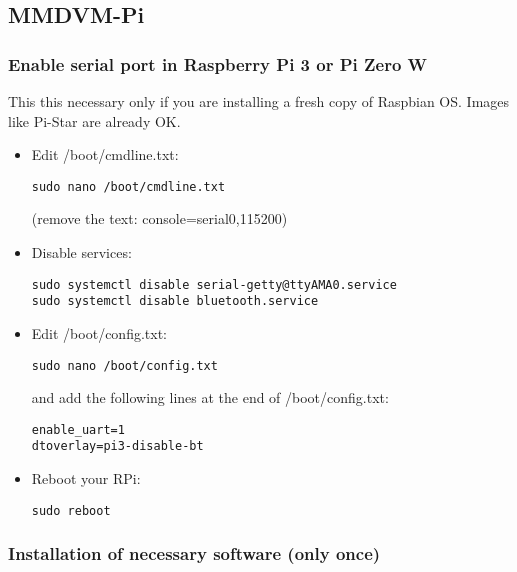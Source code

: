 \documentclass[]{article}
\begin{document}
\subsection{MMDVM-Pi}

\subsubsection{Enable serial port in Raspberry Pi 3 or Pi Zero W}

This this necessary only if you are installing a fresh copy of Raspbian OS. Images like Pi-Star are already OK.

\begin{itemize}[leftmargin=*]

\item Edit /boot/cmdline.txt:
\begin{lstlisting}[style=DOS]
sudo nano /boot/cmdline.txt
\end{lstlisting}
(remove the text: console=serial0,115200)

\item Disable services:
\begin{lstlisting}[style=DOS]
sudo systemctl disable serial-getty@ttyAMA0.service
sudo systemctl disable bluetooth.service
\end{lstlisting}

\item Edit /boot/config.txt:
\begin{lstlisting}[style=DOS]
sudo nano /boot/config.txt
\end{lstlisting}

and add the following lines at the end of /boot/config.txt:
\begin{verbatim}
enable_uart=1
dtoverlay=pi3-disable-bt
\end{verbatim}

\item Reboot your RPi:
\begin{lstlisting}[style=DOS]
sudo reboot
\end{lstlisting}

\end{itemize}

\subsubsection{Installation of necessary software (only once)}
\end{document}
